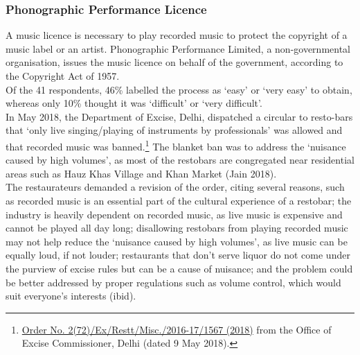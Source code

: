\documentclass[a4paper, 12pt]{article}
\begin{document}
		\subsubsection{Phonographic Performance Licence}
		A music licence is necessary to play recorded music to protect the copyright of a music label or an artist. Phonographic Performance Limited, a non-governmental organisation, issues the music licence on behalf of the government, according to the Copyright Act of 1957.\\
		Of the 41 respondents, 46\% labelled the process as ‘easy’ or ‘very easy’ to obtain, whereas only 10\% thought it was ‘difficult’ or ‘very difficult’.\\ 
		In May 2018, the Department of Excise, Delhi, dispatched a circular to resto-bars that ‘only live singing/playing of instruments by professionals’ was allowed and that recorded music was banned.\footnote{\href{https://bit.ly/2MzCM02} {Order No. 2(72)/Ex/Restt/Misc./2016-17/1567 (2018)} from the Office of Excise Commissioner, Delhi (dated 9 May 2018).} The blanket ban was to address the ‘nuisance caused by high volumes’, as most of the restobars are congregated near residential areas such as Hauz Khas Village and Khan Market (Jain 2018).\\
		The restaurateurs demanded a revision of the order, citing several reasons, such as recorded music is an essential part of the cultural experience of a restobar; the industry is heavily dependent on recorded music, as live music is expensive and cannot be played all day long; disallowing restobars from playing recorded music may not help reduce the ‘nuisance caused by high volumes’, as live music can be equally loud, if not louder; restaurants that don’t serve liquor do not come under the purview of excise rules but can be a cause of nuisance; and the problem could be better addressed by proper regulations such as volume control, which would suit everyone’s interests (ibid).
		
		
\end{document}
